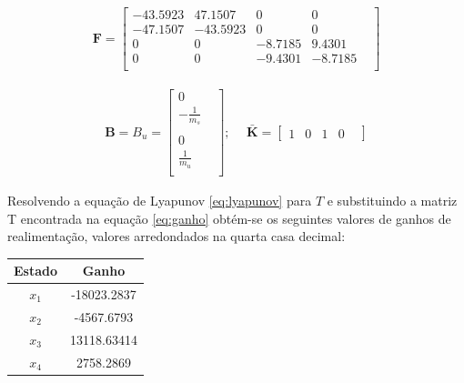\documentclass[a4paper]{ifacconf}
\begin{document}
    \begin{equation*} 
    \begin{split}
        \mathbf{F} =
        \begin{bmatrix}
            -43.5923 &  47.1507 &       0       & 0 & \\ 
            -47.1507 & -43.5923 &       0 &       0 & \\
                   0 &        0 & -8.7185 &  9.4301 & \\
                   0 &        0 & -9.4301 & -8.7185 & \\
        \end{bmatrix}
    \end{split}
    \end{equation*} 
 
    \begin{equation*} 
    \begin{split}
        \mathbf{B} = B_u = 
        \begin{bmatrix}
            0 & \\
            -\frac{1}{m_s}&\\ \\
            0 & \\
            \frac{1}{m_u} \\
        \end{bmatrix};\ \
    \end{split}
    \begin{split}
    \mathbf{\bar{K}} =
        \begin{bmatrix}
        1&0&1&0&
        \end{bmatrix}
    \end{split}
    \end{equation*} 
    
    Resolvendo a equação de Lyapunov \ref{eq:lyapunov} para $T$ e substituindo a matriz T encontrada na equação \ref{eq:ganho} obtém-se os seguintes valores de ganhos de realimentação, valores arredondados na quarta casa decimal:
    
    \begin{center}
    \begin{tabular}{|c|c|}
        \hline
        Estado & Ganho\\
        \hline
        \hline
        $x_1$    & -18023.2837\\
        $x_2$    & -4567.6793\\
        $x_3$    & 13118.63414\\   
        $x_4$    & 2758.2869 \\
        \hline
    \end{tabular}
    \end{center}
    
\end{document}
